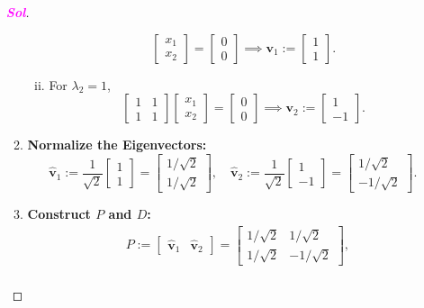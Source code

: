 \documentclass[10pt]{article}
\theoremstyle{definition}
\newcommand{\sol}{\textcolor{magenta}{\bf Sol}}
\renewcommand{\vec}[1]{\textbf{#1}}
\begin{document}
\begin{enumerate}[\bf 1.]
\begin{proof}[\sol]
\begin{enumerate}[(Step 1)]
\begin{enumerate}[(i)]
\[\begin{bmatrix}
			x_1\\x_2
		\end{bmatrix}=\begin{bmatrix}
		0\\0
	\end{bmatrix}\implies\vec{v}_1:=\begin{bmatrix}
	1\\1
\end{bmatrix}.
			\]
			\item For $\lambda_2=1$, \[
			\begin{bmatrix}
				1&1\\1&1
			\end{bmatrix}\begin{bmatrix}
				x_1\\x_2
			\end{bmatrix}=\begin{bmatrix}
				0\\0
			\end{bmatrix}\implies\vec{v}_2:=\begin{bmatrix}
				1\\-1
			\end{bmatrix}.
			\]
		\end{enumerate}
		\item \textbf{Normalize the Eigenvectors:} \[
		\hat{\vec{v}}_1:=\frac{1}{\sqrt{2}}\begin{bmatrix}
			1\\1
		\end{bmatrix}=\begin{bmatrix}
		1/\sqrt{2}\\1/\sqrt{2}
	\end{bmatrix},\quad\hat{\vec{v}}_2:=\frac{1}{\sqrt{2}}\begin{bmatrix}
	1\\-1
\end{bmatrix}=\begin{bmatrix}
1/\sqrt{2}\\-1/\sqrt{2}
\end{bmatrix}.
		\]
		\item \textbf{Construct $P$ and $D$:} \begin{align*}
			&P:=\begin{bmatrix}
				\hat{\vec{v}}_1&\hat{\vec{v}}_2
			\end{bmatrix}=\begin{bmatrix}
			1/\sqrt{2}&1/\sqrt{2}\\1/\sqrt{2}&-1/\sqrt{2}
		\end{bmatrix},\\

\end{align*}
\end{enumerate}
\end{proof}
\end{enumerate}
\end{document}

